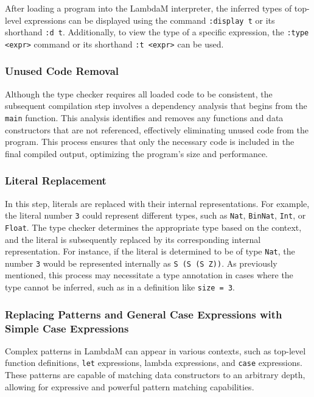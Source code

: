 \documentclass{IEEEtran}
\begin{document}
\par After loading a program into the LambdaM interpreter, the inferred types of top-level expressions can be displayed using the command \verb!:display t! or its shorthand \verb!:d t!. Additionally, to view the type of a specific expression, the \verb!:type <expr>! command or its shorthand \verb!:t <expr>! can be used.

\subsubsection{Unused Code Removal}

\par Although the type checker requires all loaded code to be consistent, the subsequent compilation step involves a dependency analysis that begins from the \texttt{main} function. This analysis identifies and removes any functions and data constructors that are not referenced, effectively eliminating unused code from the program. This process ensures that only the necessary code is included in the final compiled output, optimizing the program's size and performance.

\subsubsection{Literal Replacement}

\par In this step, literals are replaced with their internal representations. For example, the literal number \texttt{3} could represent different types, such as \texttt{Nat}, \texttt{BinNat}, \texttt{Int}, or \texttt{Float}. The type checker determines the appropriate type based on the context, and the literal is subsequently replaced by its corresponding internal representation. For instance, if the literal is determined to be of type \texttt{Nat}, the number \texttt{3} would be represented internally as \verb!S (S (S Z))!. As previously mentioned, this process may necessitate a type annotation in cases where the type cannot be inferred, such as in a definition like \verb!size = 3!.

\subsubsection{Replacing Patterns and General Case Expressions with Simple Case Expressions}

\par Complex patterns in LambdaM can appear in various contexts, such as top-level function definitions, \texttt{let} expressions, lambda expressions, and \texttt{case} expressions. These patterns are capable of matching data constructors to an arbitrary depth, allowing for expressive and powerful pattern matching capabilities.
\end{document}

